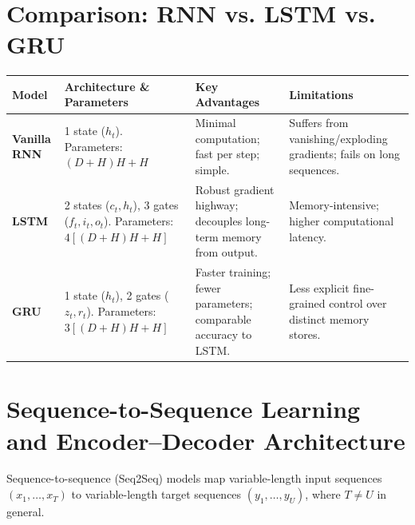 \documentclass[12pt,a4paper]{article}
\begin{document}
\section{Comparison: RNN vs. LSTM vs. GRU}
\begin{center}
\small
\begin{tabular}{p{2.2cm}p{4cm}p{4cm}p{4cm}}\toprule
\textbf{Model} & \textbf{Architecture \& Parameters} & \textbf{Key Advantages} & \textbf{Limitations} \\\midrule
\textbf{Vanilla RNN} & 1 state ($h_t$). \newline Parameters: $(D+H)H + H$ & Minimal computation; fast per step; simple. & Suffers from vanishing/exploding gradients; fails on long sequences. \\
\textbf{LSTM} & 2 states ($c_t, h_t$), 3 gates ($f_t, i_t, o_t$). \newline Parameters: $4[(D+H)H + H]$ & Robust gradient highway; decouples long-term memory from output. & Memory-intensive; higher computational latency. \\
\textbf{GRU} & 1 state ($h_t$), 2 gates ($z_t, r_t$). \newline Parameters: $3[(D+H)H + H]$ & Faster training; fewer parameters; comparable accuracy to LSTM. & Less explicit fine-grained control over distinct memory stores. \\\bottomrule
\end{tabular}
\end{center}

\section{Sequence-to-Sequence Learning and Encoder--Decoder Architecture}
Sequence-to-sequence (Seq2Seq) models map variable-length input sequences $(x_1, \dots, x_T)$ to variable-length target sequences $(y_1, \dots, y_U)$, where $T \ne U$ in general.

\begin{center}
\end{center}
\end{document}
